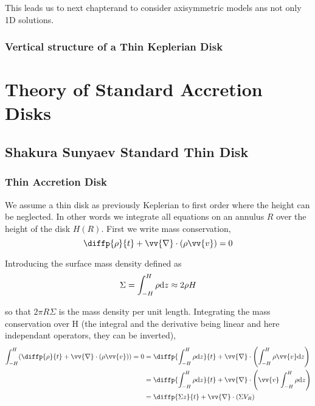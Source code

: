 \documentclass[10pt,a4paper,english,draft]{article}
\let\originalleft\left
\let\originalright\right
\renewcommand{\left}{\mathopen{}\mathclose\bgroup\originalleft}
\renewcommand{\right}{\aftergroup\egroup\originalright}
\begin{document}
This leads us to next chapterand to consider axisymmetric models ans not only 1D solutions.

\subsubsection{Vertical structure of a Thin Keplerian Disk}

\section{Theory of Standard Accretion Disks}

\subsection{Shakura Sunyaev Standard Thin Disk}

\subsubsection{Thin Accretion Disk}


We assume a thin disk as previously Keplerian to first order where the height
can be neglected. In other words we integrate all equations on an annulus $R$
over the height of the disk $H(R)$. First we write mass conservation,
\begin{equation*}
  \diffp{\rho}{t} + \vv{\nabla}\cdot(\rho \vv{v}) = 0
\end{equation*}

Introducing the surface mass density defined as
\begin{equation*}
    \Sigma = \int_{-H}^H \rho \mathrm{d}{z} \approx 2 \rho H
\end{equation*}

so that $2 \pi R \Sigma$ is the mass density per unit length. Integrating the
mass conservation over H (the integral and the derivative being linear and here
independant operators, they can be inverted),
\begin{align*}
    \int_{-H}^H \left( \diffp{\rho}{t} + \vv{\nabla}\cdot(\rho \vv{v}) \right) = 0 %
    &= \diffp{\int_{-H}^H \rho \d{z}}{t} + \vv{\nabla}\cdot\left( \int_{-H}^H \rho \vv{v} \d{z} \right) \\
    &= \diffp{\int_{-H}^H \rho \d{z}}{t} + \vv{\nabla}\cdot\left( \vv{v} \int_{-H}^H \rho \d{z} \right) \\
    &= \diffp{\Sigma z}{t} + \vv{\nabla}\cdot(\Sigma V_R)
\end{align*}
\end{document}
